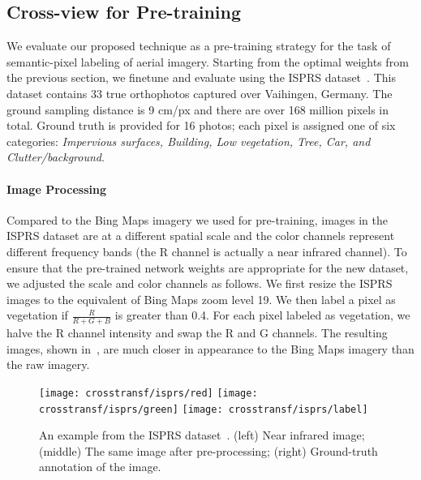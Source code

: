 \subsection{Cross-view for Pre-training}

We evaluate our proposed technique as a pre-training strategy for the
task of semantic-pixel labeling of aerial imagery.  Starting from
the optimal weights from the previous section, we finetune and
evaluate using the ISPRS dataset~\cite{rottensteiner2013isprs}.
This dataset contains 33 true orthophotos captured over
Vaihingen, Germany.  The ground sampling distance is 9 cm/px and there
are over 168 million pixels in total.  Ground truth is provided for 16
photos; each pixel is assigned one of six categories: {\em Impervious
surfaces, Building, Low vegetation, Tree, Car, and Clutter/background}.

\paragraph{Image Processing} Compared to the Bing Maps imagery we used
for pre-training, images in the ISPRS dataset are at a
different spatial scale and the color channels represent different
frequency bands (the R channel is actually a near infrared channel).
To ensure that the pre-trained network weights are appropriate for
the new dataset, we adjusted the scale and color channels as follows.
We first resize the ISPRS images to the equivalent of Bing Maps
zoom level 19.  We then label a pixel as vegetation if
$\frac{R}{R+G+B}$ is greater than 0.4. For each pixel labeled as
vegetation, we halve the R channel intensity and swap the R and G
channels.  The resulting images, shown in~, are
much closer in appearance to the Bing Maps imagery than the raw
imagery.

\begin{figure}
  \newlength{\abc}
  \setlength{\abc}{.325\linewidth}
	\texttt{[image: crosstransf/isprs/red]}
	\texttt{[image: crosstransf/isprs/green]}
	\texttt{[image: crosstransf/isprs/label]}
  \caption{An example from the ISPRS dataset~\cite{rottensteiner2013isprs}. 
  (left) Near infrared image; (middle) The same image after pre-processing; 
  (right) Ground-truth annotation of the image.}
	\label{fig:isprs:dataset}
\end{figure}


